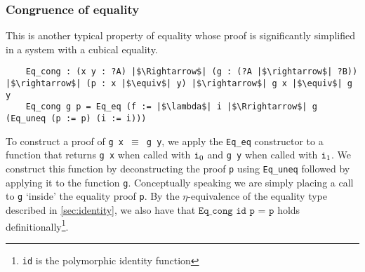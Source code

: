\documentclass[12pt,twoside,maitrise]{dms}
\theoremstyle{definition}
\numberwithin{equation}{section}
\numberwithin{table}{chapter}
\numberwithin{figure}{chapter}
\newcommand\id[1] {\texttt{#1}}
\newcommand\fn[1] {\texttt{#1}}
\begin{document}


\subsubsection*{Congruence of equality}\label{subsec:congruence-eq}
This is another typical property of equality whose proof is significantly
simplified in a system with a cubical equality.

\begin{verbatim}
    Eq_cong : (x y : ?A) |$\Rightarrow$| (g : (?A |$\rightarrow$| ?B)) |$\rightarrow$| (p : x |$\equiv$| y) |$\rightarrow$| g x |$\equiv$| g y
    Eq_cong g p = Eq_eq (f := |$\lambda$| i |$\Rrightarrow$| g (Eq_uneq (p := p) (i := i)))
\end{verbatim}

To construct a proof of \fn{g x $\equiv$ g y}, we apply the \id{Eq\_eq}
constructor to a function that returns \fn{g x} when called with $\ileft$ and
\fn{g y} when called with $\iright$. We construct this function by
deconstructing the proof \id{p} using \id{Eq\_uneq} followed by applying it to
the function \id{g}. Conceptually speaking we are simply placing a call to
\id{g} `inside' the equality proof \id{p}. By the $\eta$-equivalence of the
equality type described in \autoref{sec:identity}, we also have that
$\fn{Eq\_cong id p = p}$ holds definitionally\footnote{\id{id} is the
polymorphic identity function}.
\end{document}

